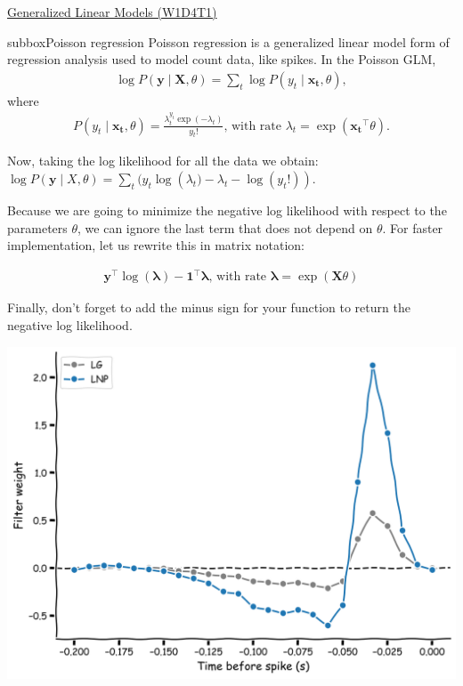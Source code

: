 \begin{textbox}{\href{https://compneuro.neuromatch.io/tutorials/W1D4_GeneralizedLinearModels/student/W1D4_Tutorial1.html}{Generalized Linear Models (W1D4T1)} }
\begin{subbox}{subbox}{Poisson regression}
\scriptsize
Poisson regression is a generalized linear model form of regression analysis used to model count data, like spikes.
In the Poisson GLM,
\begin{align}
\log P(\mathbf{y} \mid \mathbf{X}, \theta) = \sum_t \log P(y_t \mid \mathbf{x_t},\theta),
\end{align}
where
\begin{align}
P(y_t \mid \mathbf{x_t}, \theta) = \frac{\lambda_t^{y_t}\exp(-\lambda_t)}{y_t!} \text{, with rate } \lambda_t = \exp(\mathbf{x_t}^{\top} \theta).
\end{align}

Now, taking the log likelihood for all the data we obtain:
$\log P(\mathbf{y} \mid X, \theta) = \sum_t( y_t \log\left(\lambda_t) - \lambda_t - \log(y_t !)\right).$

Because we are going to minimize the negative log likelihood with respect to the parameters $\theta$, we can ignore the last term that does not depend on $\theta$. For faster implementation, let us rewrite this in matrix notation:

\begin{align}
\mathbf{y}^{\top} \log(\mathbf{\lambda}) - \mathbf{1}^{\top} \mathbf{\lambda} \text{, with  rate } \mathbf{\lambda} = \exp(\mathbf{X} \theta)
\end{align}

Finally, don't forget to add the minus sign for your function to return the negative log likelihood.

\centering
\includegraphics[scale=0.1]{Figures/GLM/GLMFigure3.png}
\end{subbox}


\end{textbox}
